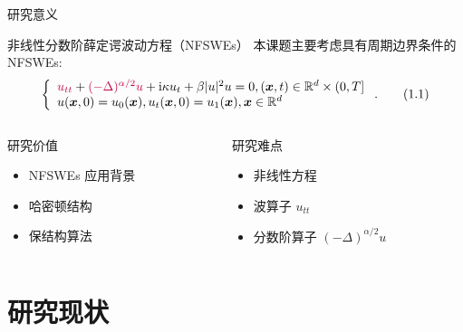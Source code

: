 \documentclass[aspectratio=169]{beamer}
\numberwithin{theorem}{section} %
\numberwithin{equation}{section}%
\numberwithin{figure}{section}%
\numberwithin{table}{section}%
\begin{document}
\begin{frame}{研究意义}
	\begin{block}{非线性分数阶薛定谔波动方程（NFSWEs）}
		本课题主要考虑具有周期边界条件的 NFSWEs:
		\begin{equation}
			\left\{\begin{array}{l}
				\textcolor{purple}{u_{t t}}+\textcolor{purple}{(-\Delta)^{\alpha / 2} u}+\mathrm{i} \kappa u_t+\beta|u|^2 u=0,(\boldsymbol{x}, t) \in \mathbb{R}^d \times(0, T] \\
				u(\boldsymbol{x}, 0)=u_0(\boldsymbol{x}), u_t(\boldsymbol{x}, 0)=u_1(\boldsymbol{x}), \boldsymbol{x} \in \mathbb{R}^d
				\end{array}\right..\tag{1.1}
		\end{equation}
	  \end{block}

\begin{columns}
\begin{column}{0.45\textwidth}
	\begin{block}{研究价值}
	\begin{itemize}
		\setlength{\itemsep}{6pt}
		\item NFSWEs 应用背景
		\item 哈密顿结构
		\item 保结构算法
		\end{itemize}
	\end{block}
\end{column}
\begin{column}{0.45\textwidth}
	\begin{block}{研究难点}
	\begin{itemize}
		\setlength{\itemsep}{6pt}
		\item 非线性方程
		\item 波算子 $u_{tt} $
		\item 分数阶算子 $(-\Delta)^{\alpha / 2} u $
		\end{itemize}
	\end{block}
\end{column}
\end{columns}

\end{frame}

\section{研究现状}
\end{document}
